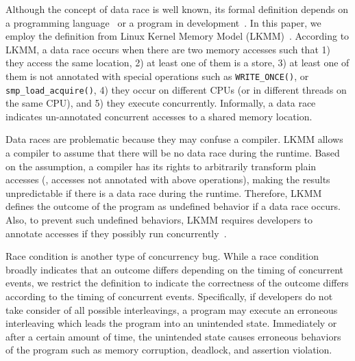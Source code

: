 %
Although the concept of data race is well known, its formal definition
depends on a programming language~\cite{C-standard-n2310,
  java-standard} or a program in development~\cite{lkmm}. In this
paper, we employ the definition from Linux Kernel Memory Model
(LKMM)~\cite{lkmm}. According to LKMM, a data race occurs when there
are two memory accesses such that 1) they access the same location, 2)
at least one of them is a store, 3) at least one of them is not
annotated with special operations such as \texttt{WRITE_ONCE()}, or
\texttt{smp_load_acquire()}, 4) they occur on different CPUs (or in
different threads on the same CPU), and 5) they execute concurrently.
%
Informally, a data race indicates un-annotated concurrent accesses to
a shared memory location.

Data races are problematic because they may confuse a compiler.  LKMM
allows a compiler to assume that there will be no data race during the
runtime. Based on the assumption, a compiler has its rights to
arbitrarily transform plain accesses (\ie, accesses not annotated with
above operations), making the results unpredictable if there is a data
race during the runtime.
%
Therefore, LKMM defines the outcome of the program as undefined
behavior if a data race occurs.
%
Also, to prevent such undefined behaviors, LKMM requires developers to
annotate accesses if they possibly run
concurrently~\cite{data-race-fix1, data-race-fix2, data-race-fix3}.


%
Race condition is another type of concurrency bug. While a race
condition broadly indicates that an outcome differs depending on the
timing of concurrent events, we restrict the definition to indicate
the correctness of the outcome differs according to the timing of
concurrent events.
%
Specifically, if developers do not take consider of all possible
interleavings, a program may execute an erroneous interleaving which
leads the program into an unintended state.
%
Immediately or after a certain amount of time, the unintended state
causes erroneous behaviors of the program such as memory corruption,
deadlock, and assertion violation.




